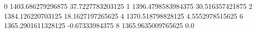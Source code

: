 0 1403.686279296875 37.7227783203125
1 1396.4798583984375 30.516357421875
2 1384.126220703125 18.1627197265625
4 1370.518798828125 4.5552978515625
6 1365.2901611328125 -0.67333984375
8 1365.9635009765625 0.0
